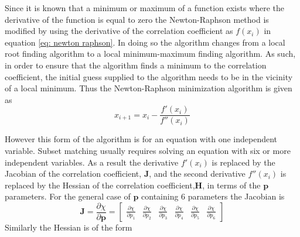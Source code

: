 Since it is known that a minimum or maximum of a function exists where the derivative of the function is equal to zero the Newton-Raphson method is modified by using the derivative of the correlation coefficient as $f(x_i)$ in equation \ref{eq: newton raphson}. In doing so the algorithm changes from a local root finding algorithm to a local minimum-maximum finding algorithm. As such, in order to ensure that the algorithm finds a minimum to the correlation coefficient, the initial guess supplied to the algorithm needs to be in the vicinity of a local minimum. Thus the Newton-Raphson minimization algorithm is given as
\begin{equation}
 	x_{i+1}=x_i-\frac{f'(x_i)}{f''(x_i)}
\end{equation}

However this form of the algorithm is for an equation with one independent variable. Subset matching usually requires solving an equation with six or more independent variables. As a result the derivative $f'(x_i)$ is replaced by the Jacobian of the correlation coefficient, $\bm{J}$, and the second derivative $f''(x_i)$ is replaced by the Hessian of the correlation coefficient,$\bm{H}$, in terms of the $\bm{p}$ parameters. For the general case of $\bm{p}$ containing 6 parameters the Jacobian is
\begin{equation}
	\label{eq: jacobian}
	\bm{J}=\frac{\partial \chi}{\partial \bm{p}}=\begin{bmatrix}
	\frac{\partial \chi}{\partial p_1} &
	\frac{\partial \chi}{\partial p_2} &
	\frac{\partial \chi}{\partial p_3} &
	\frac{\partial \chi}{\partial p_4} &
	\frac{\partial \chi}{\partial p_5} &
	\frac{\partial \chi}{\partial p_6} 
	\end{bmatrix}
\end{equation}
Similarly the Hessian is of the form
